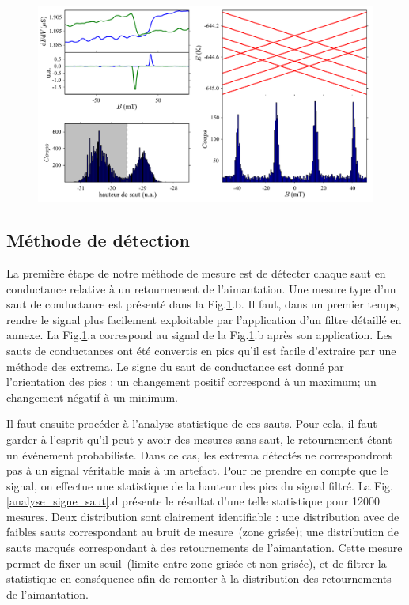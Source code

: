 \begin{figure}
\includegraphics[scale=0.5]{Resultats/Chap1/Figure3/figure3.pdf} 
\caption{}
\label{analyse_saut}
\end{figure}

\subsection{Méthode de détection}
La première étape de notre méthode de mesure est de détecter chaque saut en conductance relative à un retournement de l'aimantation. Une mesure type d'un saut de conductance est présenté dans la Fig.\ref{analyse_saut}.b. Il faut, dans un premier temps, rendre le signal plus facilement exploitable par l'application d'un filtre détaillé en annexe. La Fig.\ref{analyse_saut}.a correspond au signal de la Fig.\ref{analyse_saut}.b après son application. Les sauts de conductances ont été convertis en pics qu'il est facile d'extraire par une méthode des extrema. Le signe du saut de conductance est donné par l'orientation des pics : un changement positif correspond à un maximum; un changement négatif à un minimum.

Il faut ensuite procéder à l'analyse statistique de ces sauts. Pour cela, il faut garder à l'esprit qu'il peut y avoir des mesures sans saut, le retournement étant un événement probabiliste. Dans ce cas, les extrema détectés ne correspondront pas à un signal véritable mais à un artefact. Pour ne prendre en compte que le signal, on effectue une statistique de la hauteur des pics du signal filtré. La Fig.\ref{analyse_signe_saut}.d présente le résultat d'une telle statistique pour 12000 mesures. Deux distribution sont clairement identifiable : une distribution avec de faibles sauts correspondant au bruit de mesure~(zone grisée); une distribution de sauts marqués correspondant à des retournements de l'aimantation. Cette mesure permet de fixer un seuil~(limite entre zone grisée et non grisée), et de filtrer la statistique en conséquence afin de remonter à la distribution des retournements de l'aimantation.

